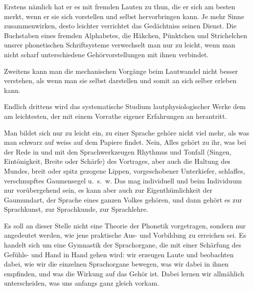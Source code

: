 Erstens nämlich hat er es mit fremden Lauten zu thun, die er sich am besten merkt, wenn er sie sich vorstellen und selbst hervorbringen kann. Je mehr Sinne zusammenwirken, desto leichter verrichtet das Gedächtniss seinen Dienst. Die Buchstaben eines fremden Alphabetes, die Häkchen, Pünktchen und Strichelchen unsrer phonetischen Schriftsysteme verwechselt man nur zu leicht, wenn man nicht scharf unterschiedene Gehörvorstellungen mit ihnen verbindet.

Zweitens kann man die mechanischen Vorgänge beim Lautwandel nicht besser verstehen, als wenn man sie selbst darstellen und somit an sich selber erleben kann. 

Endlich drittens wird das systematische Studium lautphysiologischer Werke dem am leichtesten, der mit einem Vorrathe eigener Erfahrungen an  herantritt.

Man bildet sich nur zu leicht ein, zu einer Sprache gehöre nicht viel mehr, als was man schwarz auf weiss auf dem Papiere findet. Nein, Alles gehört zu ihr, was bei der Rede in und mit den Sprachwerkzeugen  Rhythmus und Tonfall (Singen, Eintönigkeit, Breite oder Schärfe) des Vortrages, aber auch die Haltung des Mundes, breit oder spitz gezogene Lippen, vorgeschobener Unterkiefer, schlaffes, verschnupftes Gaumensegel u.~s.~w. Das mag individuell und beim Individuum nur vorübergehend sein, es kann aber auch zur Eigenthümlichkeit der Gaumundart, der Sprache eines ganzen Volkes gehören, und dann gehört es zur Sprachkunst, zur Sprachkunde, zur Sprachlehre.

Es soll an dieser Stelle nicht eine Theorie der Phonetik vorgetragen, sondern nur angedeutet werden, wie jene praktische Aus- und Vorbildung zu erreichen sei. Es handelt sich um eine Gymnastik der Sprachorgane, die mit einer Schärfung des Gefühls- und  Hand in Hand gehen wird: wir er\-\label{sp.36}zeugen Laute und beobachten dabei, wie wir die einzelnen Sprachorgane bewegen, was wir dabei in ihnen empfinden, und was die Wirkung auf das Gehör ist. Dabei lernen wir allmählich unterscheiden, was uns anfangs ganz gleich vorkam.


